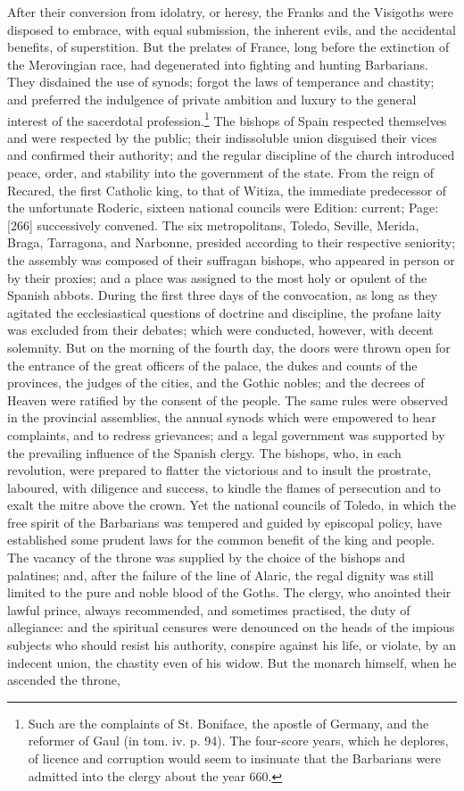 After their conversion from idolatry, or heresy, the Franks and the Visigoths were disposed to embrace, with equal submission, the inherent evils, and the accidental benefits, of superstition. But the prelates of France, long before the extinction of the Merovingian race, had degenerated into fighting and hunting Barbarians. They disdained the use of synods; forgot the laws of temperance and chastity; and preferred the indulgence of private ambition and luxury to the general interest of the sacerdotal profession.\footnote{Such are the complaints of St. Boniface, the apostle of Germany, and the reformer of Gaul (in tom. iv. p. 94). The four-score years, which he deplores, of licence and corruption would seem to insinuate that the Barbarians were admitted into the clergy about the year 660.} The bishops of Spain respected themselves and were respected by the public; their indissoluble union disguised their vices and confirmed their authority; and the regular discipline of the church introduced peace, order, and stability into the government of the state. From the reign of Recared, the first Catholic king, to that of Witiza, the immediate predecessor of the unfortunate Roderic, sixteen national councils were Edition: current; Page: [266] successively convened. The six metropolitans, Toledo, Seville, Merida, Braga, Tarragona, and Narbonne, presided according to their respective seniority; the assembly was composed of their suffragan bishops, who appeared in person or by their proxies; and a place was assigned to the most holy or opulent of the Spanish abbots. During the first three days of the convocation, as long as they agitated the ecclesiastical questions of doctrine and discipline, the profane laity was excluded from their debates; which were conducted, however, with decent solemnity. But on the morning of the fourth day, the doors were thrown open for the entrance of the great officers of the palace, the dukes and counts of the provinces, the judges of the cities, and the Gothic nobles; and the decrees of Heaven were ratified by the consent of the people. The same rules were observed in the provincial assemblies, the annual synods which were empowered to hear complaints, and to redress grievances; and a legal government was supported by the prevailing influence of the Spanish clergy. The bishops, who, in each revolution, were prepared to flatter the victorious and to insult the prostrate, laboured, with diligence and success, to kindle the flames of persecution and to exalt the mitre above the crown. Yet the national councils of Toledo, in which the free spirit of the Barbarians was tempered and guided by episcopal policy, have established some prudent laws for the common benefit of the king and people. The vacancy of the throne was supplied by the choice of the bishops and palatines; and, after the failure of the line of Alaric, the regal dignity was still limited to the pure and noble blood of the Goths. The clergy, who anointed their lawful prince, always recommended, and sometimes practised, the duty of allegiance: and the spiritual censures were denounced on the heads of the impious subjects who should resist his authority, conspire against his life, or violate, by an indecent union, the chastity even of his widow. But the monarch himself, when he ascended the throne, 